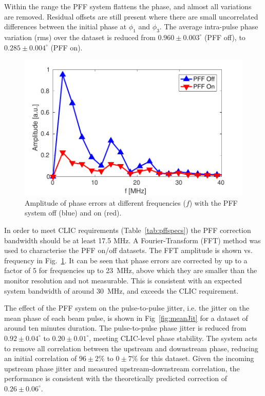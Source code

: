 \documentclass[%
 reprint,
 superscriptaddress,
 amsmath,
 amssymb,
 prl,
]{revtex4-1}
\begin{document}
Within the range the PFF system flattens the phase, and almost all variations 
are removed. 
Residual offsets are still present where there are small uncorrelated 
differences between the initial phase at \(\phi_1\) and \(\phi_3\). 
The average intra-pulse phase variation (rms) over the dataset is reduced from 
\(0.960\pm0.003^\circ\) (PFF off), to \(0.285\pm0.004^\circ\) (PFF on).

\begin{figure}
	\includegraphics[width=\columnwidth]{figs/fft}
	\caption{\label{fig:fft}Amplitude of phase errors at different frequencies 
		(\(f\)) with the PFF system off (blue) and on (red).}
\end{figure}

In order to meet CLIC requirements (Table~\ref{tab:pffspecs}) the PFF 
correction bandwidth should be at least 17.5 MHz. 
A Fourier-Transform (FFT) method was used to characterise the PFF on/off 
datasets. The FFT amplitude is shown vs. frequency in 
Fig.~\ref{fig:fft}. It can be seen that phase errors are corrected by up to a 
factor of 5 for frequencies up to 23~MHz, above which 
they are smaller than the monitor resolution and not measurable. This 
is consistent with an expected system bandwidth of around 30~MHz, and exceeds 
the CLIC requirement.

The effect of the PFF system on the pulse-to-pulse jitter, i.e. the jitter on 
the mean phase of each beam pulse, is shown in Fig~\ref{fig:meanJit} for a 
dataset of around ten minutes duration.
The pulse-to-pulse phase jitter is reduced from  \(0.92\pm0.04^\circ\) to 
\(0.20\pm0.01^\circ\), meeting CLIC-level phase stability. 
The system acts to remove all correlation between the upstream and 
downstream phase, reducing an initial correlation of \(96\pm2\%\) to 
\(0\pm7\%\) for this dataset.
Given the incoming upstream phase jitter and 
measured upstream-downstream correlation, the performance is consistent with 
the theoretically predicted correction of \(0.26\pm0.06^\circ\).
\end{document}
